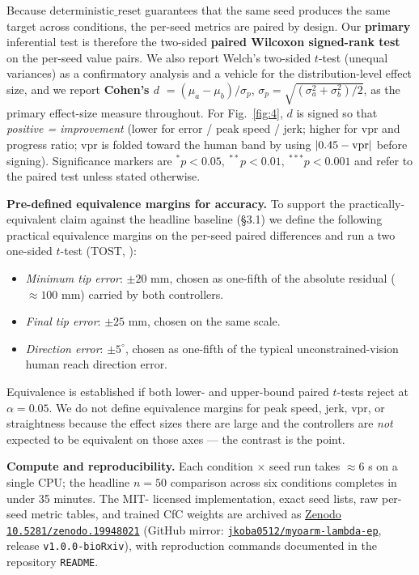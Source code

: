 \documentclass[sn-basic]{sn-jnl}
\providecommand{\tightlist}{\setlength{\itemsep}{0pt}\setlength{\parskip}{0pt}}
\begin{document}
Because \(\mathrm{deterministic\_reset}\) guarantees that the same seed
produces the same target across conditions, the per-seed metrics are
paired by design. Our \textbf{primary} inferential test is therefore the
two-sided \textbf{paired Wilcoxon signed-rank test} on the per-seed
value pairs. We also report Welch's two-sided \(t\)-test (unequal
variances) as a confirmatory analysis and a vehicle for the
distribution-level effect size, and we report \textbf{Cohen's \(d\)}
\(= (\mu_{a} - \mu_{b})/\sigma_{p}\),
\(\sigma_{p} = \sqrt{(\sigma_{a}^{2}+\sigma_{b}^{2})/2}\), as the
primary effect-size measure throughout. For Fig.~\ref{fig:4}, \(d\) is signed so
that \emph{positive = improvement} (lower for error / peak speed / jerk;
higher for vpr and progress ratio; vpr is folded toward the human band
by using \(|0.45 - {\rm vpr}|\) before signing). Significance markers
are \(^{*}p<0.05,\ ^{**}p<0.01,\ ^{***}p<0.001\) and refer to the paired
test unless stated otherwise.

\textbf{Pre-defined equivalence margins for accuracy.} To support the
practically-equivalent claim against the headline baseline (§3.1) we
define the following practical equivalence margins on the per-seed
paired differences and run a two one-sided \(t\)-test (TOST, \citealt{lakens2017}):

\begin{itemize}
\tightlist
\item
  \emph{Minimum tip error}: \(\pm 20\) mm, chosen as one-fifth of the
  absolute residual (\(\approx 100\) mm) carried by both controllers.
\item
  \emph{Final tip error}: \(\pm 25\) mm, chosen on the same scale.
\item
  \emph{Direction error}: $\pm 5^{\circ}$, chosen as one-fifth of the typical
  unconstrained-vision human reach direction error.
\end{itemize}

Equivalence is established if both lower- and upper-bound paired
\(t\)-tests reject at \(\alpha = 0.05\). We do not define equivalence
margins for peak speed, jerk, vpr, or straightness because the effect
sizes there are large and the controllers are \emph{not} expected to be
equivalent on those axes --- the contrast is the point.

\textbf{Compute and reproducibility.} Each condition $\times$ seed run takes
\(\approx 6\) s on a single CPU; the headline \(n = 50\) comparison
across six conditions completes in under 35 minutes. The MIT- licensed
implementation, exact seed lists, raw per-seed metric tables, and
trained CfC weights are archived as
\href{https://doi.org/10.5281/zenodo.19948021}{Zenodo
\texttt{10.5281/zenodo.19948021}} (GitHub mirror:
\href{https://github.com/jkoba0512/myoarm-lambda-ep}{\texttt{jkoba0512/myoarm-lambda-ep}},
release \texttt{v1.0.0-bioRxiv}), with reproduction commands documented
in the repository \texttt{README}.
\end{document}
